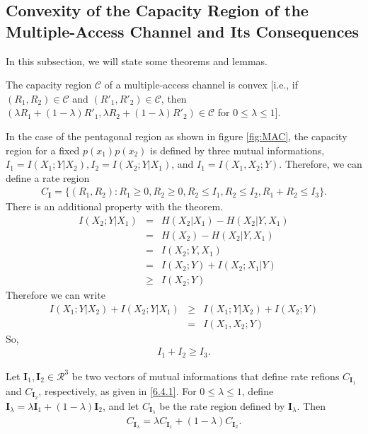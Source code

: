 \subsection{Convexity of the Capacity Region of the Multiple-Access Channel and Its Consequences}
In this subsection, we will state some theorems and lemmas. 
%
\begin{tcolorbox}[boxrule=0pt,frame hidden,sharp corners,enhanced, opacityback=0, borderline west={2pt}{0pt}{blue}]
\begin{thm} 
The capacity region $\mathcal{C}$ of a multiple-access channel is convex [i.e., if $(R_1,R_2) \in \mathcal{C}$ and $(R'_1,R'_2) \in \mathcal{C}$, then $(\lambda R_1+(1-\lambda)R'_1, \lambda R_2+(1-\lambda)R'_2) \in \mathcal{C}$ for $0 \leq \lambda \leq 1$].
\end{thm}
\end{tcolorbox}
%
In the case of the pentagonal region as shown in figure \ref{fig:MAC}, the capacity region for a fixed $p(x_1)p(x_2)$ is defined by three mutual informations, $I_1 = I(X_1;Y|X_2), I_2 = I(X_2;Y|X_1)$, and $I_1 = I(X_1, X_2; Y)$. Therefore, we can define a rate region
%
\begin{eqnarray}
    C_{\mathbf{I}} = \{ (R_1, R_2): R_1\geq 0, R_2 \geq 0, R_2 \leq I_1, R_2 \leq I_2, R_1+R_2 \leq I_3 \}.
    \label{6.4.1}
\end{eqnarray}
%
There is an additional property with the theorem.
%
\begin{eqnarray}
    I(X_2;Y|X_1) &=& H(X_2|X_1)-H(X_2|Y,X_1) \nonumber\\
    &=& H(X_2)-H(X_2|Y,X_1) \nonumber\\
    &=& I(X_2;Y,X_1) \nonumber\\
    &=& I(X_2;Y) + I(X_2;X_1|Y) \nonumber\\
    &\geq& I(X_2;Y) 
\end{eqnarray}
%
Therefore we can write
%
\begin{eqnarray}
    I(X_1;Y|X_2)+I(X_2;Y|X_1) &\geq& I(X_1;Y|X_2)+I(X_2;Y) \nonumber\\
    &=& I(X_1,X_2;Y)
\end{eqnarray}
%
So,
%
\begin{eqnarray}
    I_1+I_2 \geq I_3.
\end{eqnarray}
%
\begin{tcolorbox}[boxrule=0pt,frame hidden,sharp corners,enhanced, opacityback=0, borderline west={2pt}{0pt}{green}]
\begin{lemma} 
Let $\mathbf{I}_1, \mathbf{I}_2 \in \mathcal{R}^3$ be two vectors of mutual informations that define rate refions $C_{\mathbf{I}_1}$ and $C_{\mathbf{I}_2}$, respectively, as given in \eqref{6.4.1}. For $0\leq \lambda \leq 1$, define $\mathbf{I}_\lambda = \lambda\mathbf{I}_1+(1-\lambda)\mathbf{I}_2$, and let $C_{\mathbf{I}_\lambda}$ be the rate region defined by $\mathbf{I}_\lambda$. Then
%
\begin{eqnarray}
    C_{\mathbf{I}_\lambda} = \lambda C_{\mathbf{I}_1}+(1-\lambda)C_{\mathbf{I}_2}.
\end{eqnarray}
\end{lemma}
\end{tcolorbox}

